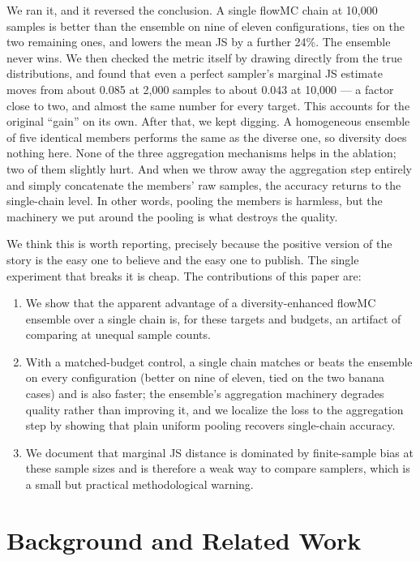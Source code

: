\documentclass[11pt]{article}
\begin{document}
We ran it, and it reversed the conclusion. A single flowMC chain at 10,000
samples is better than the ensemble on nine of eleven configurations, ties on
the two remaining ones, and lowers the mean JS by a further 24\%. The ensemble
never wins. We then checked the metric itself by drawing directly from the
true distributions, and found that even a perfect sampler's marginal JS
estimate moves from about 0.085 at 2,000 samples to about 0.043 at 10,000 ---
a factor close to two, and almost the same number for every target. This
accounts for the original ``gain'' on its own. After that, we kept digging. A
homogeneous ensemble of five identical members performs the same as the
diverse one, so diversity does nothing here. None of the three aggregation
mechanisms helps in the ablation; two of them slightly hurt. And when we throw
away the aggregation step entirely and simply concatenate the members' raw
samples, the accuracy returns to the single-chain level. In other words,
pooling the members is harmless, but the machinery we put around the pooling
is what destroys the quality.

We think this is worth reporting, precisely because the positive version of
the story is the easy one to believe and the easy one to publish. The single
experiment that breaks it is cheap. The contributions of this paper are:

\begin{enumerate}
\item We show that the apparent advantage of a diversity-enhanced flowMC
ensemble over a single chain is, for these targets and budgets, an artifact of
comparing at unequal sample counts.
\item With a matched-budget control, a single chain matches or beats the
ensemble on every configuration (better on nine of eleven, tied on the two
banana cases) and is also faster; the ensemble's aggregation machinery degrades quality rather than
improving it, and we localize the loss to the aggregation step by showing that
plain uniform pooling recovers single-chain accuracy.
\item We document that marginal JS distance is dominated by finite-sample bias
at these sample sizes and is therefore a weak way to compare samplers, which
is a small but practical methodological warning.
\end{enumerate}

\section{Background and Related Work}
\end{document}
